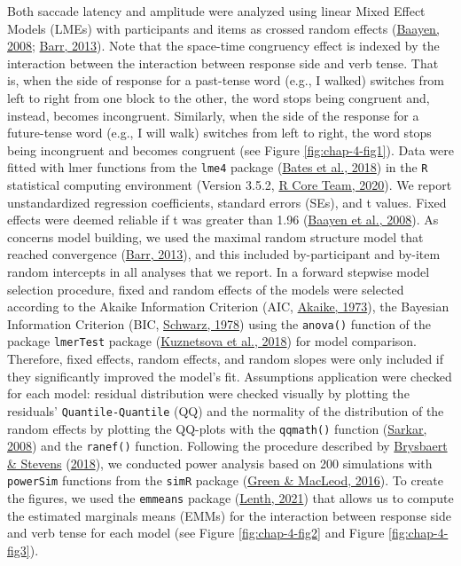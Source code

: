 \documentclass[
  a4paper,12pt,twoside,onecolumn,openright,final,oldfontcommands]{memoir}
\begin{document}
Both saccade latency and amplitude were analyzed using linear Mixed Effect Models (LMEs) with participants and items as crossed random effects (\protect\hyperlink{ref-baayen_analyzing_2008}{Baayen, 2008}; \protect\hyperlink{ref-barr_random_2013}{Barr, 2013}). Note that the space-time congruency effect is indexed by the interaction between the interaction between response side and verb tense. That is, when the side of response for a past-tense word (e.g., I walked) switches from left to right from one block to the other, the word stops being congruent and, instead, becomes incongruent. Similarly, when the side of the response for a future-tense word (e.g., I will walk) switches from left to right, the word stops being incongruent and becomes congruent (see Figure \ref{fig:chap-4-fig1}). Data were fitted with lmer functions from the \texttt{lme4} package (\protect\hyperlink{ref-R-lme4}{Bates et al., 2018}) in the \texttt{R} statistical computing environment (Version 3.5.2, \protect\hyperlink{ref-r_core_team_r_2020}{R Core Team, 2020}). We report unstandardized regression coefficients, standard errors (SEs), and t values. Fixed effects were deemed reliable if \textbar t\textbar{} was greater than 1.96 (\protect\hyperlink{ref-baayen_mixed-effects_2008}{Baayen et al., 2008}). As concerns model building, we used the maximal random structure model that reached convergence (\protect\hyperlink{ref-barr_random_2013}{Barr, 2013}), and this included by-participant and by-item random intercepts in all analyses that we report. In a forward stepwise model selection procedure, fixed and random effects of the models were selected according to the Akaike Information Criterion (AIC, \protect\hyperlink{ref-akaike_maximum_1973}{Akaike, 1973}), the Bayesian Information Criterion (BIC, \protect\hyperlink{ref-schwarz_estimating_1978}{Schwarz, 1978}) using the \texttt{anova()} function of the package \texttt{lmerTest} package (\protect\hyperlink{ref-R-lmerTest}{Kuznetsova et al., 2018}) for model comparison. Therefore, fixed effects, random effects, and random slopes were only included if they significantly improved the model's fit. Assumptions application were checked for each model: residual distribution were checked visually by plotting the residuals' \texttt{Quantile-Quantile} (QQ) and the normality of the distribution of the random effects by plotting the QQ-plots with the \texttt{qqmath()} function (\protect\hyperlink{ref-sarkar_lattice_2008}{Sarkar, 2008}) and the \texttt{ranef()} function. Following the procedure described by \protect\hyperlink{ref-brysbaert_power_2018}{Brysbaert \& Stevens} (\protect\hyperlink{ref-brysbaert_power_2018}{2018}), we conducted power analysis based on 200 simulations with \texttt{powerSim} functions from the \texttt{simR} package (\protect\hyperlink{ref-green_simr_2016}{Green \& MacLeod, 2016}). To create the figures, we used the \texttt{emmeans} package (\protect\hyperlink{ref-lenth_emmeans_2021}{Lenth, 2021}) that allows us to compute the estimated marginals means (EMMs) for the interaction between response side and verb tense for each model (see Figure \ref{fig:chap-4-fig2} and Figure \ref{fig:chap-4-fig3}).
\end{document}
